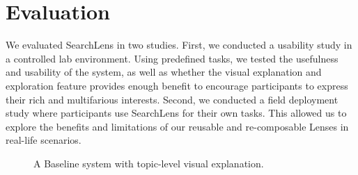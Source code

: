 \documentclass{sigchi}
\begin{document}
\section{Evaluation}

We evaluated SearchLens in two studies. First, we conducted a usability study in a controlled lab environment. Using predefined tasks, we tested the usefulness and usability of the system, as well as whether the visual explanation and exploration feature provides enough benefit to encourage participants to express their rich and multifarious interests. Second, we conducted a field deployment study where participants use SearchLens for their own tasks. This allowed us to explore the benefits and limitations of our reusable and re-composable Lenses in real-life scenarios.




\begin{figure}[]
    \centering
    \caption{A Baseline system with topic-level visual explanation.}
    \label{fig:baseline}
\end{figure}
\end{document}
